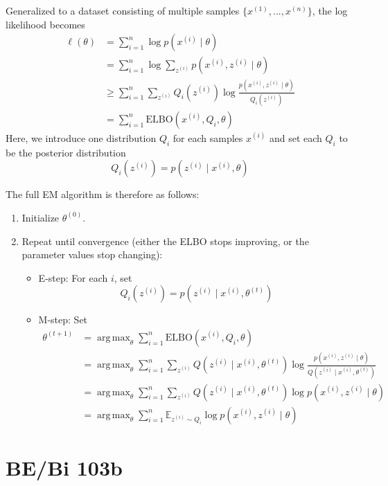 \documentclass[11pt]{article}
\theoremstyle{definition}
\DeclareMathOperator*{\argmax}{arg\,max}
\begin{document}
Generalized to a dataset consisting of multiple samples $\{x^{(1)}, ..., x^{(n)}\}$, the log likelihood becomes
$$
\begin{aligned}
\ell(\theta)
&= \sum_{i=1}^n \log p(x^{(i)} \mid \theta) \\
&= \sum_{i=1}^n \log \sum_{z^{(i)}} p(x^{(i)}, z^{(i)} \mid \theta) \\
&\geq \sum_{i=1}^n \sum_{z^{(i)}} Q_i(z^{(i)}) \log \frac{p(x^{(i)}, z^{(i)} \mid \theta)}{Q_i(z^{(i)})} \\
&= \sum_{i=1}^n \text{ELBO}(x^{(i)}, Q_i, \theta)
\end{aligned}
$$
Here, we introduce one distribution $Q_i$ for each samples $x^{(i)}$ and set each $Q_i$ to be the posterior distribution
$$
Q_i(z^{(i)}) = p(z^{(i)} \mid x^{(i)}, \theta)
$$

The full EM algorithm is therefore as follows:
\begin{enumerate}
    \item Initialize $\theta^{(0)}$.
    \item Repeat until convergence (either the ELBO stops improving, or the parameter values stop changing):
    \begin{itemize}
        \item E-step: For each $i$, set 
        $$
        Q_i(z^{(i)}) = p(z^{(i)} \mid x^{(i)}, \theta^{(t)})
        $$
        \item M-step: Set
        $$
        \begin{aligned}
        \theta^{(t+1)}
        &= \argmax_\theta \sum_{i=1}^n \text{ELBO}(x^{(i)}, Q_i, \theta) \\
        &= \argmax_\theta \sum_{i=1}^n \sum_{z^{(i)}} Q(z^{(i)} \mid x^{(i)}, \theta^{(t)}) \log \frac{p(x^{(i)}, z^{(i)} \mid \theta)}{Q(z^{(i)} \mid x^{(i)}, \theta^{(t)})} \\
        &= \argmax_\theta \sum_{i=1}^n \sum_{z^{(i)}} Q(z^{(i)} \mid x^{(i)}, \theta^{(t)}) \log p(x^{(i)}, z^{(i)} \mid \theta) \\
        &= \argmax_\theta \sum_{i=1}^n \mathbb{E}_{z^{(i)} \sim Q_i} \log p(x^{(i)}, z^{(i)} \mid \theta)
        \end{aligned}
        $$
    \end{itemize}
\end{enumerate}

\section{BE/Bi 103b}
\end{document}
